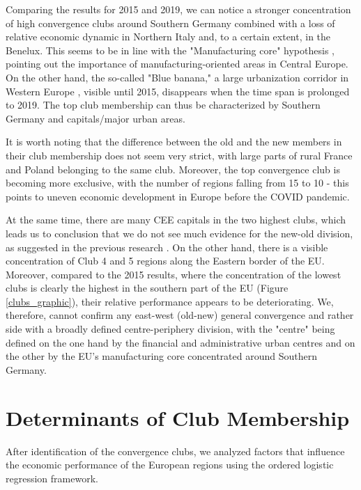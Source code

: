 \documentclass[11pt]{article}
\begin{document}
Comparing the results for 2015 and 2019, we can notice a stronger concentration of high convergence clubs around Southern Germany combined with a loss of relative economic dynamic in Northern Italy and, to a certain extent, in the Benelux. This seems to be in line with the "Manufacturing core" hypothesis \citep{cutrini2019economic, stollinger2016structural}, pointing out the importance of manufacturing-oriented areas in Central Europe. On the other hand, the so-called "Blue banana," a large urbanization corridor in Western Europe \citep{hospers2002beyond}, visible until 2015, disappears when the time span is prolonged to 2019. The top club membership can thus be characterized by Southern Germany and capitals/major urban areas.

It is worth noting that the difference between the old and the new members in their club membership does not seem very strict, with large parts of rural France and Poland belonging to the same club. Moreover, the top convergence club is becoming more exclusive, with the number of regions falling from 15 to 10 - this points to uneven economic development in Europe before the COVID pandemic.

At the same time, there are many CEE capitals in the two highest clubs, which leads us to conclusion that we do not see much evidence for the new-old division, as suggested in the previous research \citep{eckey2007convergence}.
On the other hand, there is a visible concentration of Club 4 and 5 regions along the Eastern border of the EU. Moreover, compared to the 2015 results, where the concentration of the lowest clubs is clearly the highest in the southern part of the EU (Figure \ref{clubs_graphic}), their relative performance appears to be deteriorating. We, therefore, cannot confirm any east-west (old-new) general convergence and rather side with a broadly defined centre-periphery division, with the "centre" being defined on the one hand by the financial and administrative urban centres and on the other by the EU's manufacturing core concentrated around Southern Germany.


\newpage
\section{Determinants of Club Membership}
\label{Determinants of club membership}


 
After identification of the convergence clubs, we analyzed factors that influence the economic performance of the European regions using the ordered logistic regression framework.
\end{document}
